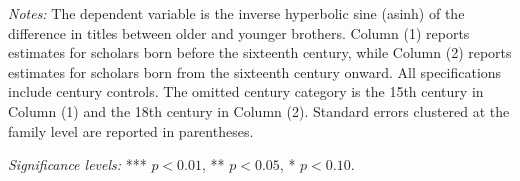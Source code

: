 \begin{table}[H]
\vspace{4pt}
\begin{minipage}{\textwidth}
\footnotesize
\textit{Notes:} The dependent variable is the inverse hyperbolic sine (asinh) of the difference in titles between older and younger brothers. Column (1) reports estimates for scholars born before the sixteenth century, while Column (2) reports estimates for scholars born from the sixteenth century onward. All specifications include century controls. The omitted century category is the 15th century in Column (1) and the 18th century in Column (2). Standard errors clustered at the family level are reported in parentheses.

\textit{Significance levels:} *** $p<0.01$, ** $p<0.05$, * $p<0.10$.
\end{minipage}

\end{table}